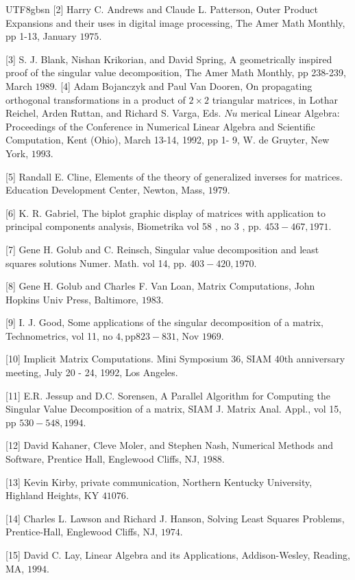 \documentclass[11pt,a4paper,twoside]{article}
\begin{document}
\begin{CJK}{UTF8}{gbsn}
[2] Harry C. Andrews and Claude L. Patterson, Outer Product Expansions and their uses in digital image processing, The Amer Math Monthly, pp 1-13, January $1975 .$

[3] S. J. Blank, Nishan Krikorian, and David Spring, A geometrically inspired proof of the singular value decomposition, The Amer Math Monthly, pp 238-239, March $1989 .$ [4] Adam Bojanczyk and Paul Van Dooren, On propagating orthogonal transformations in a product of $2 \times 2$ triangular matrices, in Lothar Reichel, Arden Ruttan, and Richard S. Varga, Eds. $N u$ merical Linear Algebra: Proceedings of the Conference in Numerical Linear Algebra and Scientific Computation, Kent (Ohio), March 13-14, 1992, pp 1- 9, W. de Gruyter, New York, $1993 .$

[5] Randall E. Cline, Elements of the theory of generalized inverses for matrices. Education Development Center, Newton, Mass, $1979 .$

[6] K. R. Gabriel, The biplot graphic display of matrices with application to principal components analysis, Biometrika vol 58 , no 3 , pp. $453-467,1971 .$

[7] Gene H. Golub and C. Reinsch, Singular value decomposition and least squares solutions Numer. Math. vol 14, pp. $403-420,1970 .$

[8] Gene H. Golub and Charles F. Van Loan, Matrix Computations, John Hopkins Univ Press, Baltimore, $1983 .$

[9] I. J. Good, Some applications of the singular decomposition of a matrix, Technometrics, vol 11, no $4, \mathrm{pp} 823-831$, Nov $1969 .$

[10] Implicit Matrix Computations. Mini Symposium 36, SIAM 40th anniversary meeting, July 20 - 24, 1992, Los Angeles.

[11] E.R. Jessup and D.C. Sorensen, A Parallel Algorithm for Computing the Singular Value Decomposition of a matrix, SIAM J. Matrix Anal. Appl., vol 15, pp $530-548,1994 .$

[12] David Kahaner, Cleve Moler, and Stephen Nash, Numerical Methods and Software, Prentice Hall, Englewood Cliffs, NJ, $1988 .$

[13] Kevin Kirby, private communication, Northern Kentucky University, Highland Heights, KY $41076 .$

[14] Charles L. Lawson and Richard J. Hanson, Solving Least Squares Problems, Prentice-Hall, Englewood Cliffs, NJ, $1974 .$

[15] David C. Lay, Linear Algebra and its Applications, Addison-Wesley, Reading, MA, $1994 .$


\end{CJK}
\end{document}
